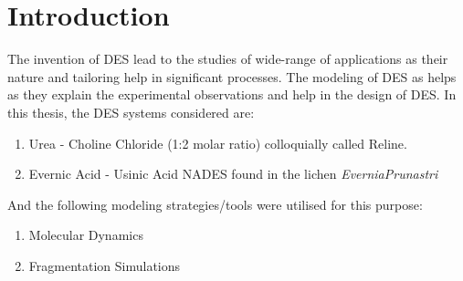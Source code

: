 \section{Introduction}
The invention of DES lead to the studies of wide-range of applications as their nature and tailoring help in significant processes. The modeling of DES as helps as they explain the experimental observations and help in the design of DES. In this thesis, the DES systems considered are:
\begin{enumerate}
\item Urea - Choline Chloride (1:2 molar ratio) colloquially called Reline.
\item Evernic Acid - Usinic Acid NADES found in the lichen \textit{EverniaPrunastri}
\end{enumerate}
And the following modeling strategies/tools were utilised for this purpose:
\begin{enumerate}
\item Molecular Dynamics
\item Fragmentation Simulations

\end{enumerate}